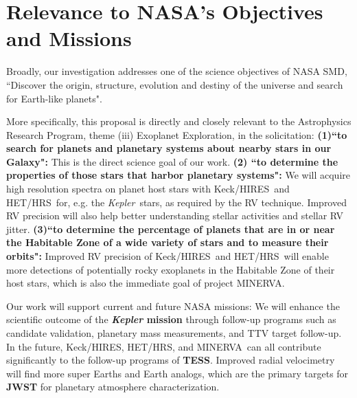\documentclass[12pt]{article}
\def\kepler{{\it Kepler}}
\def\minerva{MINERVA}
\def\hrs{HET/HRS}
\def\keck{Keck/HIRES}
\begin{document}
 
\vspace{-10pt}
\section{Relevance to NASA's Objectives and Missions}
\vspace{-5pt}

Broadly, our investigation addresses one of the science
objectives of NASA SMD, ``Discover the origin, structure, evolution
and destiny of the universe and search for Earth-like planets".

More specifically, this proposal is directly and closely relevant to
the Astrophysics Research Program, theme (iii) Exoplanet Exploration,
in the solicitation: \textbf{(1)``to search for planets and planetary
  systems about nearby stars in our Galaxy":} This is the direct
science goal of our work. \textbf{(2) ``to determine the properties of
  those stars that harbor planetary systems":} We will acquire high
resolution spectra on planet host stars with \keck\ and \hrs\ for,
e.g. the \kepler\ stars, as required by the RV technique. Improved RV
precision will also help better understanding stellar activities and
stellar RV jitter. \textbf{(3)``to determine the percentage of planets
  that are in or near the Habitable Zone of a wide variety of stars
  and to measure their orbits":} Improved RV precision of \keck\ and
\hrs\ will enable more detections of potentially rocky exoplanets in
the Habitable Zone of their host stars, which is also the immediate
goal of project \minerva.

Our work will support current and future NASA missions: We will
enhance the scientific outcome of the \textbf{\textit{Kepler} mission}
through follow-up programs such as candidate validation, planetary
mass measurements, and TTV target follow-up. In the future, \keck,
\hrs, and \minerva\ can all contribute significantly to the follow-up
programs of \textbf{TESS}. Improved radial velocimetry will find more
super Earths and Earth analogs, which are the primary targets for
\textbf{JWST} for planetary atmosphere characterization.


\vspace{-3pt}
{\small %
 }
\end{document}
